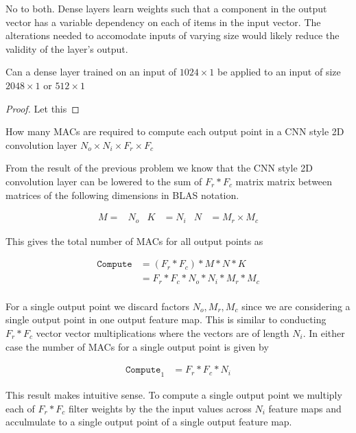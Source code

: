 \documentclass[11pt]{article}
\begin{document}
\begin{solution}
	No to both. Dense layers learn weights such that a component in the output
	vector has a variable dependency on each of items in the input vector. The
	alterations needed to accomodate inputs of varying size would likely
	reduce the validity of the layer's output.
\end{solution}

Can a dense layer trained on an input of $1024\times1$ be applied to an input
of size $2048\times1$ or $512\times1$

\begin{proof}
	Let this
\end{proof}

How many MACs are required to compute each output point in a CNN style 2D
convolution layer $N_o \times N_i \times F_r \times F_c$

\begin{solution}
	From the result of the previous problem we know that the CNN style 2D
	convolution layer can be lowered to the sum of $F_r * F_c$ matrix matrix
	between matrices of the following dimensions in BLAS notation.

	\begin{align}
		M=&N_o & K&=N_i & N&=M_r \times M_c
	\end{align}

	This gives the total number of MACs for all output points as

	\begin{align}
		\texttt{Compute} &= (F_r * F_c) * M * N * K \\
		&= F_r * F_c * N_o * N_i * M_r * M_c \\
	\end{align}

	For a single output point we discard factors $N_o, M_r, M_c$ since we are
	considering a single output point in one output feature map. This is
	similar to conducting $F_r * F_c$ vector vector multiplications where the
	vectors are of length $N_i$. In either case the number of MACs for a single
	output point is given by

	\begin{align}
		\texttt{Compute}_1 &= F_r * F_c * N_i
	\end{align}

	This result makes intuitive sense. To compute a single output point we
	multiply each of $F_r * F_c$ filter weights by the the input values across
	$N_i$ feature maps and acculmulate to a single output point of a single
	output feature map.

\end{solution}
\end{document}
